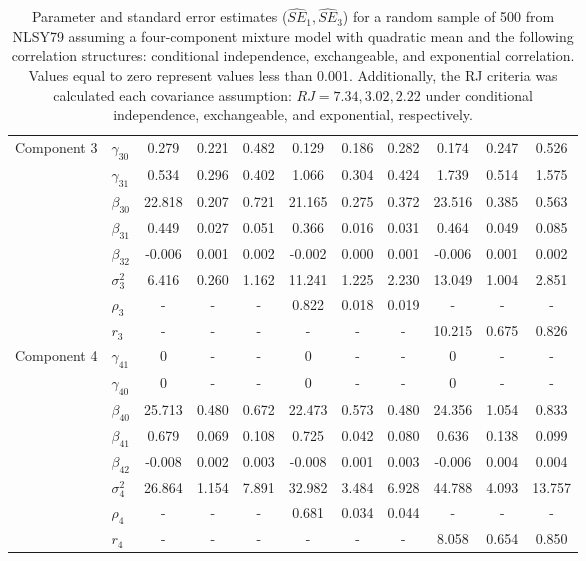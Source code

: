 \documentclass[10pt]{article}
\begin{document}
\begin{table}[ht]
\begin{center}
\begin{tabular}{llccccccccc}
  Component 3 & $\gamma_{30}$ & 0.279 & 0.221 & 0.482 & 0.129 & 0.186 & 0.282 & 0.174 & 0.247 & 0.526 \\ 
    & $\gamma_{31}$ & 0.534 & 0.296 & 0.402 & 1.066 & 0.304 & 0.424 & 1.739 & 0.514 & 1.575 \\ 
    & $\beta_{30}$ & 22.818 & 0.207 & 0.721 & 21.165 & 0.275 & 0.372 & 23.516 & 0.385 & 0.563 \\ 
    & $\beta_{31}$ & 0.449 & 0.027 & 0.051 & 0.366 & 0.016 & 0.031 & 0.464 & 0.049 & 0.085 \\ 
    & $\beta_{32}$ & -0.006 & 0.001 & 0.002 & -0.002 & 0.000 & 0.001 & -0.006 & 0.001 & 0.002 \\ 
    & $\sigma_3^2$ & 6.416 & 0.260 & 1.162 & 11.241 & 1.225 & 2.230 & 13.049 & 1.004 & 2.851 \\ 
    & $\rho_3$ & - & - & - & 0.822 & 0.018 & 0.019 & - & - & - \\ 
    & $r_3$ & - & - & - & - & - & - & 10.215 & 0.675 & 0.826 \\ 
  Component 4 & $\gamma_{41}$ & 0 & - & - & 0 & - & - & 0 & - & - \\ 
    & $\gamma_{40}$ & 0 & - & - & 0 & - & - & 0 & - & - \\ 
    & $\beta_{40}$ & 25.713 & 0.480 & 0.672 & 22.473 & 0.573 & 0.480 & 24.356 & 1.054 & 0.833 \\ 
    & $\beta_{41}$ & 0.679 & 0.069 & 0.108 & 0.725 & 0.042 & 0.080 & 0.636 & 0.138 & 0.099 \\ 
    & $\beta_{42}$ & -0.008 & 0.002 & 0.003 & -0.008 & 0.001 & 0.003 & -0.006 & 0.004 & 0.004 \\ 
    & $\sigma_4^2$ & 26.864 & 1.154 & 7.891 & 32.982 & 3.484 & 6.928 & 44.788 & 4.093 & 13.757 \\ 
    & $\rho_4$ & - & - & - & 0.681 & 0.034 & 0.044 & - & - & - \\ 
    & $r_4$ & - & - & - & - & - & - & 8.058 & 0.654 & 0.850 \\ 
   \hline\end{tabular}
\caption{Parameter and standard error estimates ($\widehat{SE}_{1},\widehat{SE}_{3}$) for a random sample of 500 from NLSY79 assuming a four-component mixture model with quadratic mean and the following correlation structures: conditional independence, exchangeable, and exponential correlation. Values equal to zero represent values less than 0.001. Additionally, the RJ criteria was calculated each covariance assumption: $RJ=7.34, 3.02, 2.22$ under conditional independence, exchangeable, and exponential, respectively.}
\label{tab:dat}
\end{center}
\end{table}
\end{document}
